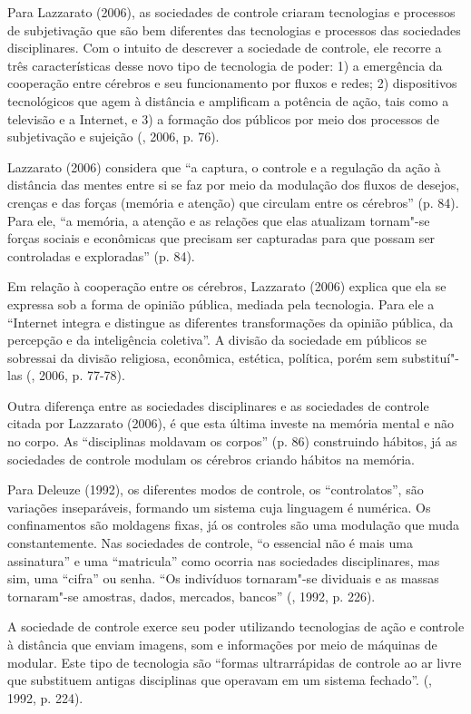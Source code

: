 Para Lazzarato (2006), as sociedades de controle criaram tecnologias e
processos de subjetivação que são bem diferentes das tecnologias e
processos das sociedades disciplinares. Com o intuito de descrever a
sociedade de controle, ele recorre a três características desse novo
tipo de tecnologia de poder: 1) a emergência da cooperação entre
cérebros e seu funcionamento por fluxos e redes; 2) dispositivos
tecnológicos que agem à distância e amplificam a potência de ação, tais
como a televisão e a Internet, e 3) a formação dos públicos por meio dos
processos de subjetivação e sujeição (, 2006, p. 76).

Lazzarato (2006) considera que ``a captura, o controle e a regulação da
ação à distância das mentes entre si se faz por meio da modulação dos
fluxos de desejos, crenças e das forças (memória e atenção) que circulam
entre os cérebros'' (p. 84). Para ele, ``a memória, a atenção e as
relações que elas atualizam tornam"-se forças sociais e econômicas que
precisam ser capturadas para que possam ser controladas e exploradas''
(p. 84).

Em relação à cooperação entre os cérebros, Lazzarato (2006) explica que
ela se expressa sob a forma de opinião pública, mediada pela tecnologia.
Para ele a ``Internet integra e distingue as diferentes transformações
da opinião pública, da percepção e da inteligência coletiva''. A divisão
da sociedade em públicos se sobressai da divisão religiosa, econômica,
estética, política, porém sem substituí"-las (, 2006, p. 77-78).

Outra diferença entre as sociedades disciplinares e as sociedades de
controle citada por Lazzarato (2006), é que esta última investe na
memória mental e não no corpo. As ``disciplinas moldavam os corpos''
(p. 86) construindo hábitos, já as sociedades de controle modulam os
cérebros criando hábitos na memória.

Para Deleuze (1992), os diferentes modos de controle, os
``controlatos'', são variações inseparáveis, formando um sistema cuja
linguagem é numérica. Os confinamentos são moldagens fixas, já os
controles são uma modulação que muda constantemente. Nas sociedades de
controle, ``o essencial não é mais uma assinatura'' e uma ``matricula''
como ocorria nas sociedades disciplinares, mas sim, uma ``cifra'' ou
senha. ``Os indivíduos tornaram"-se dividuais e as massas tornaram"-se
amostras, dados, mercados, bancos'' (, 1992, p. 226).

A sociedade de controle exerce seu poder utilizando tecnologias de ação
e controle à distância que enviam imagens, som e informações por meio de
máquinas de modular. Este tipo de tecnologia são ``formas ultrarrápidas
de controle ao ar livre que substituem antigas disciplinas que operavam
em um sistema fechado''. (, 1992, p. 224).

